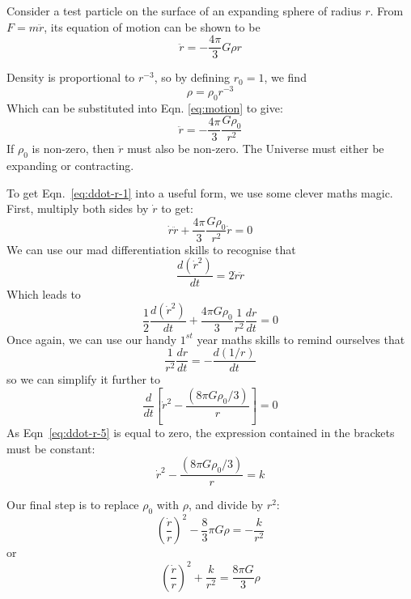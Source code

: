 \documentclass[11pt,a4paper,notoc]{tufte-handout}
\begin{document}
Consider a test particle on the surface of an expanding sphere of radius
\(r\). From \(F= m \ddot{r}\), its equation of motion can be shown to be
\begin{equation}
    \ddot{r} = -\dfrac{4\pi}{3} G \rho r
\label{eq:motion}
\end{equation}

Density is proportional to \(r^{-3}\), so by defining \(r_{0} = 1\), we find
\[\rho = \rho_{0}r^{-3}\] Which can be substituted into Eqn. \eqref{eq:motion} to give:
\begin{equation}
    \ddot{r} = -\dfrac{4\pi}{3}\dfrac{G\rho_0}{r^2}
\label{eq:ddot-r-1}
\end{equation}
If \(\rho_0\) is
non-zero, then \(\ddot{r}\) must also be non-zero. The Universe must
either be expanding or contracting.

To get Eqn.~\eqref{eq:ddot-r-1} into a useful form, we use some clever maths
magic. First, multiply both sides by \(\dot{r}\) to get:
\begin{equation}
\dot{r}\ddot{r} + \dfrac{4\pi}{3}\dfrac{G\rho_{0}}{r^2}\dot{r} = 0
\label{eq:ddot-r-2}
\end{equation}
We can use our mad differentiation skills to recognise that
\begin{equation}
\dfrac{d(\dot{r}^2)}{dt} = 2\dot{r}\ddot{r}
\label{eq:ddot-r-3}
\end{equation}
Which leads to
\begin{equation}
\dfrac{1}{2}\dfrac{d(\dot{r}^2)}{dt} + \dfrac{4\pi G \rho_0}{3} \dfrac{1}{r^2}\dfrac{dr}{dt} = 0
\label{eq:ddot-r-4}
\end{equation}
Once again, we can use our handy \(1^{st}\) year maths skills to remind
ourselves that
\begin{equation}
\dfrac{1}{r^2}\dfrac{dr}{dt} = -\dfrac{d(1/r)}{dt}
\label{eq:ddot-r-4}
\end{equation}
so we can simplify it further to
\begin{equation}
\dfrac{d}{dt}\left[\dot{r}^2 - \dfrac{(8\pi G \rho_0 / 3)}{r}\right] = 0
\label{eq:ddot-r-5}
\end{equation}
As Eqn~\eqref{eq:ddot-r-5} is equal to zero, the expression contained in the
brackets must be constant:
\begin{equation}
\dot{r}^2 - \dfrac{(8\pi G \rho_0 / 3)}{r} = k
\label{eq:ddot-r-6}
\end{equation}

Our final step is to replace \(\rho_0\) with \(\rho\), and divide by \(r^2\):
\begin{equation}
\left(\dfrac{\dot{r}}{r}\right)^2 - \dfrac{8}{3}\pi G \rho = -\dfrac{k}{r^2}
\label{eq:ddot-r-7}
\end{equation}
or
\begin{equation}
\left(\dfrac{\dot{r}}{r}\right)^2 + \dfrac{k}{r^2} = \dfrac{8\pi G}{3}\rho
\label{eq:ddot-r-8}
\end{equation}
\end{document}
